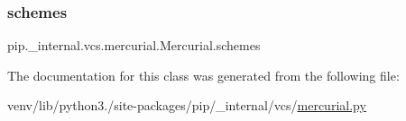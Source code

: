 \subsubsection{\texorpdfstring{schemes}{schemes}}
{\footnotesize\ttfamily pip.\+\_\+internal.\+vcs.\+mercurial.\+Mercurial.\+schemes\hspace{0.3cm}{\ttfamily [static]}}



The documentation for this class was generated from the following file\+:\begin{DoxyCompactItemize}
\item 
venv/lib/python3./site-\/packages/pip/\+\_\+internal/vcs/\hyperlink{mercurial_8py}{mercurial.\+py}\end{DoxyCompactItemize}
